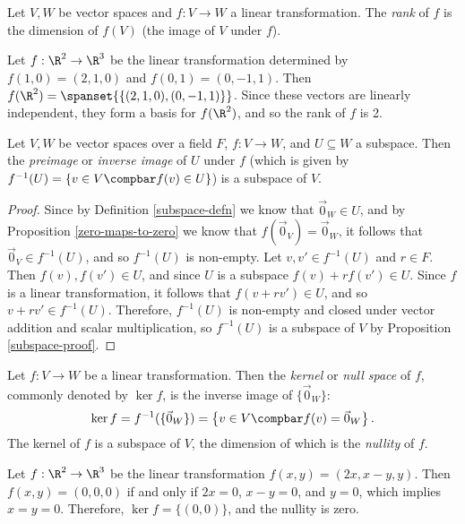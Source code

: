 \documentclass[12pt]{article}
\begin{document}
\begin{defn}
    Let $V, W$ be vector spaces and $f: V \to W$ a linear transformation. The \emph{rank} of $f$ is the dimension of $f(V)$ (the image of $V$ under $f$).
\end{defn}

\begin{exmp}
    Let $f: \R^2 \to \R^3$ be the linear transformation determined by $f(1, 0) = (2, 1, 0)$ and $f(0, 1) = (0, -1, 1)$. Then $f(\R^2) = \spanset{\{(2, 1, 0), (0, -1, 1)\}}$. Since these vectors are linearly independent, they form a basis for $f(\R^2)$, and so the rank of $f$ is 2.
\end{exmp}

\begin{prop}
    Let $V, W$ be vector spaces over a field $F$, $f: V \to W$, and $U \subseteq W$ a subspace. Then the \emph{preimage} or \emph{inverse image} of $U$ under $f$ (which is given by $f^{-1}(U) = \left\{v \in V \compbar f(v) \in U\right\}$) is a subspace of $V$.
\end{prop}

\begin{proof}
    Since by Definition \ref{subspace-defn} we know that $\vec{0}_W \in U$, and by Proposition \ref{zero-maps-to-zero} we know that $f(\vec{0}_V) = \vec{0}_W$, it follows that $\vec{0}_V \in f^{-1}(U)$, and so $f^{-1}(U)$ is non-empty. Let $v, v' \in f^{-1}(U)$ and $r \in F$. Then $f(v), f(v') \in U$, and since $U$ is a subspace $f(v) + rf(v') \in U$. Since $f$ is a linear transformation, it follows that $f(v + rv') \in U$, and so $v + rv' \in f^{-1}(U)$. Therefore, $f^{-1}(U)$ is non-empty and closed under vector addition and scalar multiplication, so $f^{-1}(U)$ is a subspace of $V$ by Proposition \ref{subspace-proof}.
\end{proof}

\begin{defn}
    Let $f: V \to W$ be a linear transformation. Then the \emph{kernel} or \emph{null space} of $f$, commonly denoted by $\ker f$, is the inverse image of $\{\vec{0}_W\}$: \[\ker f = f^{-1}(\{\vec{0}_W\}) = \left\{v \in V \compbar f(v) = \vec{0}_W\right\}.\] The kernel of $f$ is a subspace of $V$, the dimension of which is the \emph{nullity} of $f$.
\end{defn}

\begin{exmp}
    Let $f: \R^2 \to \R^3$ be the linear transformation $f(x, y) = (2x, x-y, y)$. Then $f(x, y) = (0, 0, 0)$ if and only if $2x = 0$, $x - y = 0$, and $y = 0$, which implies $x = y = 0$. Therefore, $\ker f = \{(0, 0)\}$, and the nullity is zero.
\end{exmp}
\end{document}
